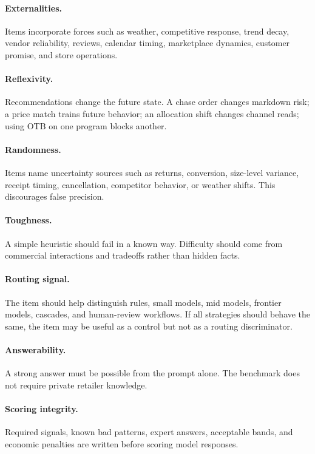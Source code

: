 \documentclass[11pt]{article}
\begin{document}
\paragraph{Externalities.}
Items incorporate forces such as weather, competitive response, trend decay, vendor reliability, reviews, calendar timing, marketplace dynamics, customer promise, and store operations.

\paragraph{Reflexivity.}
Recommendations change the future state. A chase order changes markdown risk; a price match trains future behavior; an allocation shift changes channel reads; using OTB on one program blocks another.

\paragraph{Randomness.}
Items name uncertainty sources such as returns, conversion, size-level variance, receipt timing, cancellation, competitor behavior, or weather shifts. This discourages false precision.

\paragraph{Toughness.}
A simple heuristic should fail in a known way. Difficulty should come from commercial interactions and tradeoffs rather than hidden facts.

\paragraph{Routing signal.}
The item should help distinguish rules, small models, mid models, frontier models, cascades, and human-review workflows. If all strategies should behave the same, the item may be useful as a control but not as a routing discriminator.

\paragraph{Answerability.}
A strong answer must be possible from the prompt alone. The benchmark does not require private retailer knowledge.

\paragraph{Scoring integrity.}
Required signals, known bad patterns, expert answers, acceptable bands, and economic penalties are written before scoring model responses.
\end{document}
